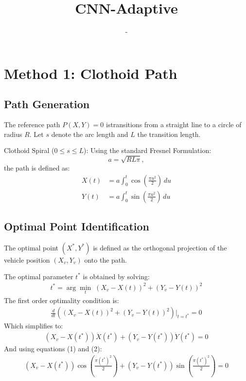 \documentclass{article}
\title{CNN-Adaptive}
\author{-}
\begin{document}
\maketitle

\section{Method 1: Clothoid Path}

\subsection{Path Generation}
The reference path $P(X,Y)=0$ istransitions from a straight line to a 
circle of radius $R$. 
Let $s$ denote the arc length and $L$ the transition length.

Clothoid Spiral ($0 \le s \le L$):  Using the standard Fresnel Formulation:
\[
a = \sqrt{R L \pi},
\]
the path is defined as:
\begin{align}
X(t) &= a \int_{0}^{t} \cos\left(\frac{\pi u^2}{2}\right)\, du \\
Y(t) &= a \int_{0}^{t} \sin\left(\frac{\pi u^2}{2}\right)\, du
\end{align}




\subsection{Optimal Point Identification}

The optimal point $(X^*, Y^*)$ is defined as the orthogonal projection of the 
vehicle position $(X_v, Y_v)$ onto the path.

The optimal parameter $t^*$ is obtained by solving:
\begin{align}
t^* = \arg \min_{t} \; (X_v - X(t))^2 + (Y_v - Y(t))^2
\end{align}
The first order optimality condition is:
\begin{align}
\frac{d}{dt} \left((X_v - X(t))^2 + (Y_v - Y(t))^2\right) \Big|_{t=t^*} = 0
\end{align}
Which simplifies to:
\begin{align}(X_v - X(t^*)) \dot X(t^*) + (Y_v - Y(t^*)) \dot Y(t^*) = 0
\end{align}
And using equations (1) and (2):
\begin{align}(X_v - X(t^*)) \cos\left(\frac{\pi (t^*)^2}{2}\right) + (Y_v - Y(t^*)) 
    \sin\left(\frac{\pi (t^*)^2}{2}\right) = 0
\end{align} 
\end{document}
